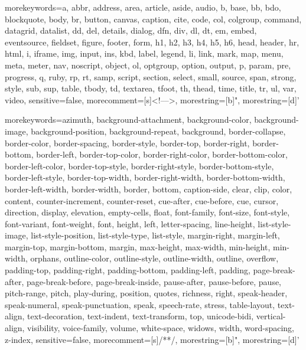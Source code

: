 
 {morekeywords={a, abbr, address, area, article, aside, audio, b, base, bb, bdo, blockquote,  body, br, button, canvas, caption, cite, code, col, colgroup, command, datagrid, datalist, dd, del, details, dialog, dfn, div, dl, dt, em, embed, eventsource, fieldset, figure, footer,  form,  h1, h2,  h3,  h4, h5,  h6,  head,  header,  hr, html,  i, iframe,  img,  input,  ins, kbd,  label,  legend,  li,  link,  mark,  map,  menu,  meta,  meter,  nav,  noscript,  object,  ol,  optgroup,  option,  output,  p,  param,  pre,  progress,  q,  ruby,  rp,  rt,  samp,  script,  section,  select,  small,  source,  span,  strong,  style,  sub,  sup,  table,  tbody,  td,  textarea,  tfoot,  th,  thead,  time,  title,  tr,  ul,  var,  video},
sensitive=false, morecomment=[s]{<!--}{-->}, morestring=[b]", morestring=[d]'}

 {morekeywords={azimuth,  background-attachment,  background-color,  background-image,  background-position,  background-repeat,  background,  border-collapse,  border-color,  border-spacing,  border-style,  border-top, border-right, border-bottom, border-left,  border-top-color, border-right-color, border-bottom-color, border-left-color,  border-top-style, border-right-style, border-bottom-style, border-left-style,  border-top-width, border-right-width, border-bottom-width, border-left-width,  border-width,  border,  bottom,  caption-side,  clear,  clip,  color,  content,  counter-increment,  counter-reset,  cue-after,  cue-before,  cue,  cursor,  direction,  display,  elevation,  empty-cells,  float,  font-family,  font-size,  font-style,  font-variant,  font-weight,  font,  height,  left,  letter-spacing,  line-height,  list-style-image,  list-style-position,  list-style-type,  list-style,  margin-right, margin-left,  margin-top, margin-bottom,  margin,  max-height,  max-width,  min-height,  min-width,  orphans,  outline-color,  outline-style,  outline-width,  outline,  overflow,  padding-top, padding-right, padding-bottom, padding-left,  padding,  page-break-after,  page-break-before,  page-break-inside,  pause-after,  pause-before,  pause,  pitch-range,  pitch,  play-during,  position,  quotes,  richness,  right,  speak-header,  speak-numeral,  speak-punctuation,  speak,  speech-rate,  stress,  table-layout,  text-align,  text-decoration,  text-indent,  text-transform,  top,  unicode-bidi,  vertical-align,  visibility,  voice-family,  volume,  white-space,  widows,  width,  word-spacing,  z-index},
sensitive=false, morecomment=[s]{/*}{*/}, morestring=[b]", morestring=[d]'}

